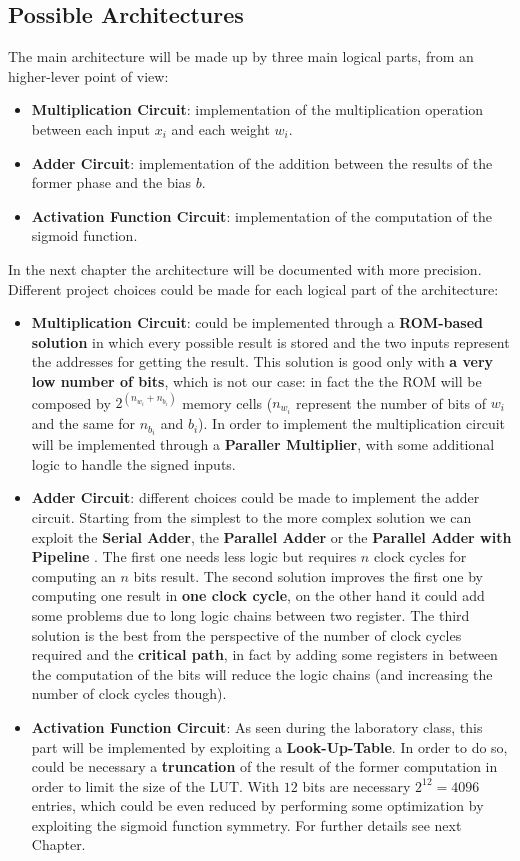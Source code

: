 \subsection{Possible Architectures}

The main architecture will be made up by three main logical parts, from an higher-lever point of view:
\begin{itemize}
	\item \textbf{Multiplication Circuit}: implementation of the multiplication operation between each input $x_{i}$ and each weight $w_{i}$.
	\item \textbf{Adder Circuit}: implementation of the addition between the results of the former phase and the bias $b$.
	\item \textbf{Activation Function Circuit}: implementation of the computation of the sigmoid function.
\end{itemize}

In the next chapter the architecture will be documented with more precision.
Different project choices could be made for each logical part of the architecture:

\begin{itemize}
	\item{\textbf{Multiplication Circuit}}: could be implemented through a \textbf{ROM-based solution} in which every possible result is stored and the two inputs represent the addresses for getting the result. This solution is good only with \textbf{a very low number of bits}, which is not our case: in fact the the ROM will be composed by $2^{(n_{w_{i}} + n_{b_{i}})}$ memory cells ($n_{w_{i}}$ represent the number of bits of $w_{i}$ and the same for $n_{b_{i}}$ and $b_{i}$). In order to implement the multiplication circuit will be implemented through a  \textbf{Paraller Multiplier}, with some additional logic to handle the signed inputs.
	\item{\textbf{Adder Circuit}}: different choices could be made to implement the adder circuit. Starting from the simplest to the more complex solution we can exploit the \textbf{Serial Adder}, the \textbf{Parallel Adder} or the \textbf{Parallel Adder with Pipeline }. The first one needs less logic but requires $n$ clock cycles for computing an $n$ bits result. The second solution improves the first one by computing one result in \textbf{one clock cycle}, on the other hand it could add some problems due to long logic chains between two register. The third solution is the best from the perspective of the number of clock cycles required and the \textbf{critical path}, in fact by adding some registers in between the computation of the bits will reduce the logic chains (and increasing the number of clock cycles though). 
	\item{\textbf{Activation Function Circuit}}: As seen during the laboratory class, this part will be implemented by exploiting a \textbf{Look-Up-Table}. In order to do so, could be necessary a \textbf{truncation} of the result of the former computation in order to limit the size of the LUT. With $12$ bits are necessary $2^{12} = 4096$ entries, which could be even reduced by performing some optimization by exploiting the sigmoid function symmetry. For further details see next Chapter.
\end{itemize} 
